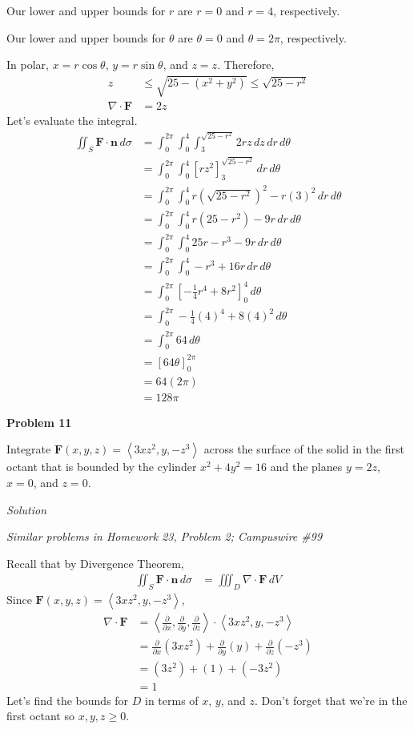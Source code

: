 \documentclass{article}
\newcommand{\lrp}[1]{\left( #1 \right)}
\newcommand{\lra}[1]{\left\langle #1 \right\rangle}
\newcommand{\lrb}[1]{\left[ #1 \right]}
\newcommand{\F}[0]{\mathbf{F}}
\newcommand{\n}[0]{{\mathbf{n}}}
\newcommand{\Solution}{\textit{Solution}}
\begin{document}
Our lower and upper bounds for $r$ are $r=0$ and $r=4$, respectively.

Our lower and upper bounds for $\theta$ are $\theta=0$ and $\theta=2\pi$, respectively.

In polar, $x=r\cos\theta$, $y=r\sin\theta$, and $z=z$. Therefore,
\begin{align*}
    z&\leq \sqrt{25-(x^2+y^2)}\leq \sqrt{25 - r^2}\tag{in polar, $x^2+y^2=r^2$}\\
    \nabla \cdot \F &=2z\tag{no change}
\end{align*}
Let's evaluate the integral.
\begin{align*}
    \iint_S \F\cdot \n\,d\sigma 
    &=\int_0^{2\pi}\int_0^{4}\int_3^{\sqrt{25-r^2}}2rz\,dz\,dr\,d\theta\tag{don't forget our Jacobian $r$!}\\
    &=\int_0^{2\pi}\int_0^{4}\lrb{rz^2}_3^{\sqrt{25-r^2}}\,dr\,d\theta\\
    &=\int_0^{2\pi}\int_0^4 r\lrp{\sqrt{25-r^2}}^2-r(3)^2\,dr\,d\theta\\
    &=\int_0^{2\pi}\int_0^4 r(25-r^2)-9r\,dr\,d\theta\\
    &=\int_0^{2\pi}\int_0^4 25r-r^3-9r\,dr\,d\theta\\
    &=\int_0^{2\pi}\int_0^4  -r^3 +16r\,dr\,d\theta\\
    &=\int_0^{2\pi}\lrb{-\frac{1}{4}r^4+8r^2}_0^4\,d\theta\\
    &=\int_0^{2\pi}-\frac{1}{4}(4)^4+8(4)^2\,d\theta\\
    &=\int_0^{2\pi}64\,d\theta\tag{use a calculator}\\
    &=\lrb{64\theta}_0^{2\pi}\\
    &=64(2\pi)\\
    &=\boxed{128\pi}
\end{align*}

{}\textbf{Problem 11}

Integrate $\F(x,y,z)=\lra{3xz^2,y,-z^3}$ across the surface of the solid in the first octant that is bounded by the cylinder $x^2+4y^2=16$ and the planes $y=2z$, $x=0$, and $z=0$.

\Solution

\textit{Similar problems in Homework 23, Problem 2; Campuswire \#99}

Recall that by Divergence Theorem,
\begin{align*}
    \iint_S \F\cdot \n\,d\sigma &=\iiint_D \nabla \cdot \F\,dV
\end{align*}
Since $\F(x,y,z)=\lra{3xz^2,y,-z^3}$,
\begin{align*}
    \nabla \cdot \F& = \lra{\frac{\partial }{\partial x},\frac{\partial }{\partial y},\frac{\partial }{\partial z}}\cdot \lra{3xz^2,y,-z^3}\\
    &=\frac{\partial }{\partial x}\lrp{3xz^2}+\frac{\partial }{\partial y}\lrp{y}+\frac{\partial }{\partial z}\lrp{-z^3}\\
    &=\lrp{3z^2}+\lrp{1}+\lrp{-3z^2}\\
    &=1
\end{align*}
Let's find the bounds for $D$ in terms of $x$, $y$, and $z$. Don't forget that we're in the first octant so $x,y,z\geq 0$.
\end{document}
